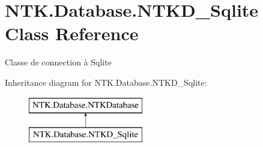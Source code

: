 \hypertarget{class_n_t_k_1_1_database_1_1_n_t_k_d___sqlite}{}\section{N\+T\+K.\+Database.\+N\+T\+K\+D\+\_\+\+Sqlite Class Reference}
\label{class_n_t_k_1_1_database_1_1_n_t_k_d___sqlite}


Classe de connection à Sqlite  


Inheritance diagram for N\+T\+K.\+Database.\+N\+T\+K\+D\+\_\+\+Sqlite\+:\begin{figure}[H]
\begin{center}
\leavevmode
\includegraphics[height=2.000000cm]{d0/d18/class_n_t_k_1_1_database_1_1_n_t_k_d___sqlite}
\end{center}
\end{figure}
